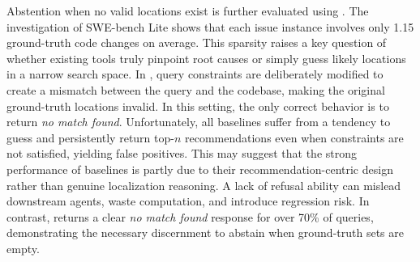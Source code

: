 Abstention when no valid locations exist is further evaluated using \negset. The investigation of SWE-bench Lite shows that each issue instance involves only 1.15 ground-truth code changes on average. This sparsity raises a key question of whether existing tools truly pinpoint root causes or simply guess likely locations in a narrow search space. In \negset, query constraints are deliberately modified to create a mismatch between the query and the codebase, making the original ground-truth locations invalid. In this setting, the only correct behavior is to return \textit{no match found}. Unfortunately, all baselines suffer from a tendency to guess and persistently return top-$n$ recommendations even when constraints are not satisfied, yielding false positives. This may suggest that the strong performance of baselines is partly due to their recommendation-centric design rather than genuine localization reasoning. A lack of refusal ability can mislead downstream agents, waste computation, and introduce regression risk. In contrast, \tooldataloc returns a clear \textit{no match found} response for over 70\% of \negset queries, demonstrating the necessary discernment to abstain when ground-truth sets are empty.

\smallskip
\noindent{}
